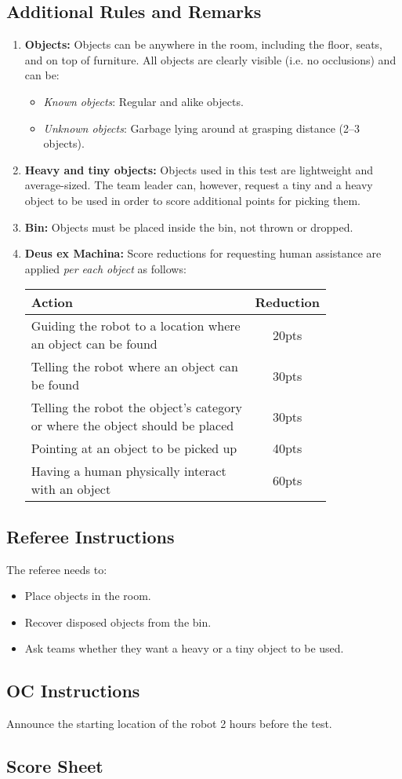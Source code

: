 \subsection*{Additional Rules and Remarks}
\begin{enumerate}[nosep]
	\item \textbf{Objects:}
	Objects can be anywhere in the room, including the floor, seats, and on top of furniture.
	All objects are clearly visible (i.e. no occlusions) and can be:
	\begin{itemize}[nosep]
		\item\textit{Known objects}: Regular and alike objects.    
    \item\textit{Unknown objects}: Garbage lying around at grasping distance (2--3 objects).
	\end{itemize}

	\item \textbf{Heavy and tiny objects:} Objects used in this test are lightweight and average-sized.
	The team leader can, however, request a tiny and a heavy object to be used in order to score additional points for picking them.

	\item \textbf{Bin:} Objects must be placed inside the bin, not thrown or dropped.

	\item \textbf{Deus ex Machina:} Score reductions for requesting human assistance are applied \emph{per each object} as follows:
	\begin{table}[h]
		\begin{tabular}{m{0.8\linewidth} c}
			\textbf{Action} & \textbf{Reduction} \\\hline
			Guiding the robot to a location where an object can be found & 20pts \\
			Telling the robot where an object can be found & 30pts \\
			Telling the robot the object's category or where the object should be placed & 30pts \\
			Pointing at an object to be picked up & 40pts \\
			Having a human physically interact with an object & 60pts \\\hline
		\end{tabular}
	\end{table}
\end{enumerate}

\subsection*{Referee Instructions}
The referee needs to:
\begin{itemize}
	\item Place objects in the room.
	\item Recover disposed objects from the bin.
	\item Ask teams whether they want a heavy or a tiny object to be used.
\end{itemize}

\subsection*{OC Instructions}
Announce the starting location of the robot 2 hours before the test.

\subsection*{Score Sheet}

